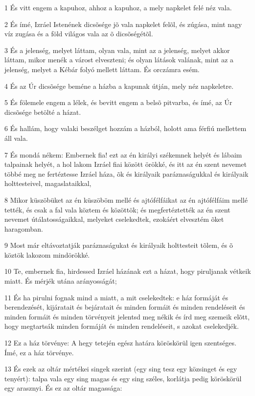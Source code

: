 \par 1 És vitt engem a kapuhoz, ahhoz a kapuhoz, a mely napkelet felé néz vala.
\par 2 És ímé, Izráel Istenének dicsõsége jõ vala napkelet felõl, és zúgása, mint nagy víz zugása és a föld világos vala az õ dicsõségétõl.
\par 3 És a jelenség, melyet láttam, olyan vala, mint az a jelenség, melyet akkor láttam, mikor menék a várost elveszteni; és olyan látások valának, mint az a jelenség, melyet a Kébár folyó mellett láttam. És orczámra esém.
\par 4 És az Úr dicsõsége beméne a házba a kapunak útján, mely néz napkeletre.
\par 5 És fölemele engem a lélek, és bevitt engem a belsõ pitvarba, és ímé, az Úr dicsõsége betölté a házat.
\par 6 És hallám, hogy valaki beszélget hozzám a házból, holott ama férfiú mellettem áll vala.
\par 7 És mondá nékem: Embernek fia! ezt az én királyi székemnek helyét és lábaim talpainak helyét, a hol lakom Izráel fiai között örökké, és itt az én szent nevemet többé meg ne fertéztesse  Izráel háza, õk és királyaik paráznaságukkal és királyaik holttesteivel, magaslataikkal,
\par 8 Mikor küszöbüket az én küszöböm mellé és ajtófélfáikat az én ajtófélfáim mellé tették, és csak a fal vala köztem és közöttök; és megfertéztették az én szent nevemet útálatosságaikkal, melyeket cselekedtek, ezokáért elvesztém õket haragomban.
\par 9 Most már eltávoztatják paráznaságukat és királyaik holttesteit tõlem, és õ köztök lakozom mindörökké.
\par 10 Te, embernek fia, hirdessed Izráel házának ezt a házat, hogy piruljanak vétkeik miatt. És mérjék utána arányosságát;
\par 11 És ha pirulni fognak mind a miatt, a mit cselekedtek: e ház formáját és berendezését, kijáratait és bejáratait és minden formáit és minden rendeléseit és minden formáit és minden törvényeit jelentsd meg nékik és írd meg szemeik elõtt, hogy megtartsák minden formáját és minden rendeléseit, s azokat cselekedjék.
\par 12 Ez a ház törvénye: A hegy tetején egész határa köröskörül igen szentséges. Ímé, ez a ház törvénye.
\par 13 És ezek az oltár mértékei singek szerint (egy sing tesz egy közsinget és egy tenyért): talpa vala egy sing magas és egy sing széles, korlátja pedig köröskörül egy arasznyi. És ez az oltár magassága:
